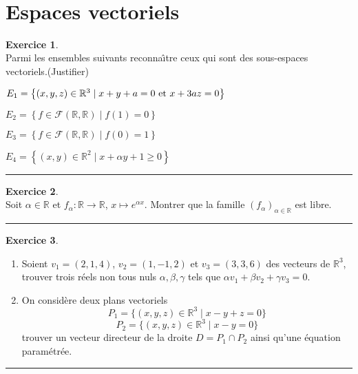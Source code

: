 \documentclass[a4paper,10pt]{article}
\theoremstyle{definition}
\theoremstyle{definition}
\newtheorem{exo}{Exercice}
\newcommand{\R}{\mathbb{R}}
\begin{document}
\hfill\\

\section*{Espaces vectoriels}
\begin{minipage}{1\linewidth}
	\begin{minipage}[t]{0.48\linewidth}
		\raggedright
		
		
		
		\begin{exo}\quad\\
		Parmi les ensembles suivants reconna\^\i tre ceux qui sont des
		sous-espaces vectoriels.(Justifier)
		
		$ E_1 =\left\{ (x,y,z)\in \R^3 \mid x+y+a=0 \hbox{ et }  x +3az =0\right\}$
		
		$ E_2 =\left\{f \in {\mathcal F}(\R,\R) \mid f(1)=0\right\}$
		
		$ E_3 =\left\{f \in {\mathcal F}(\R,\R) \mid  f(0)=1\right\}$
		
		$E_4 =\left\{(x,y)\in \R^2 \mid x + \alpha y +1 \geqslant 0\right\}$	
			
			\centering
			\rule{1\linewidth}{0.6pt}
		\end{exo}
	
	\begin{exo}\quad\\
		Soit $\alpha \in \R$ et $f_\alpha : \R \to \R$, $x\mapsto e^{\alpha x}$.
		Montrer que la famille $(f_\alpha)_{\alpha \in \R}$  est libre.
		
		\centering
		\rule{1\linewidth}{0.6pt}
	\end{exo}
		
		
		
		
	\end{minipage}	
	\hfill\vrule\hfill
	\begin{minipage}[t]{0.48\linewidth}
		\raggedright
		
	\begin{exo}\quad\\
		\begin{enumerate}
			\item Soient $v_1=(2,1,4)$, $v_2=(1,-1,2)$ et $v_3=(3,3,6)$ des vecteurs de $\R^3$, 
			trouver trois r\'eels non tous nuls $\alpha,\beta,\gamma$ tels que $\alpha v_1+ \beta v_2 + \gamma v_3=0$.
			
			\item On considère deux plans vectoriels
			$$P_1=\{(x,y,z) \in \R^3 \mid x-y+z=0\}$$
			$$P_2=\{(x,y,z) \in \R^3 \mid x-y=0\}$$
			trouver un vecteur directeur de la droite $D=P_1\cap P_2$ ainsi qu'une \'equation param\'etr\'ee.
		\end{enumerate}
		
		\centering
		\rule{1\linewidth}{0.6pt}
	\end{exo}

	
	\end{minipage}
\end{minipage}
\end{document}
